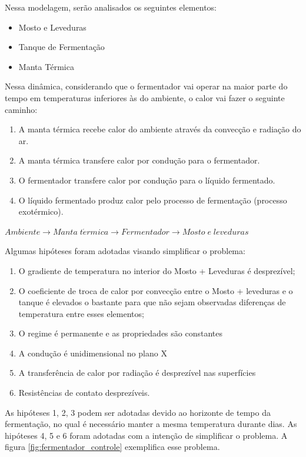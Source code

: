 Nessa modelagem, serão analisados os seguintes elementos: 
\begin{itemize}
    \item Mosto e Leveduras 
    \item Tanque de Fermentação 
    \item Manta Térmica 
\end{itemize}

Nessa dinâmica, considerando que o fermentador vai operar na maior parte do tempo em temperaturas inferiores às do ambiente, o calor vai fazer o seguinte caminho:
\begin{enumerate}
    \item A manta térmica recebe calor do ambiente através da convecção e radiação do ar. 
    \item A manta térmica transfere calor por condução para o fermentador. 
    \item O fermentador transfere calor por condução para o líquido fermentado. 
    \item O líquido fermentado produz calor pelo processo de fermentação (processo exotérmico).
\end{enumerate}

\begin{center}
    \(Ambiente \longrightarrow Manta\;t\acute{e}rmica \longrightarrow Fermentador \longrightarrow Mosto\;e\;leveduras\)
\end{center}



    
Algumas hipóteses foram adotadas visando simplificar o problema: 

\begin{enumerate}
    \item O gradiente de temperatura no interior do Mosto + Leveduras é desprezível; 
    \item O coeficiente de troca de calor por convecção entre o Mosto + leveduras e o tanque é elevados o bastante para que não sejam observadas diferenças de temperatura entre esses elementos; 
    \item O regime é permanente e as propriedades são constantes 
    \item A condução é unidimensional no plano X
    \item A transferência de calor por radiação é desprezível nas superfícies 
    \item Resistências de contato desprezíveis.
\end{enumerate}


As hipóteses 1, 2, 3  podem ser adotadas devido ao horizonte de tempo da fermentação, no qual é necessário manter a mesma temperatura durante dias. As hipóteses 4, 5 e 6 foram adotadas com a intenção de simplificar o problema. A figura \ref{fig:fermentador_controle} exemplifica esse problema.

